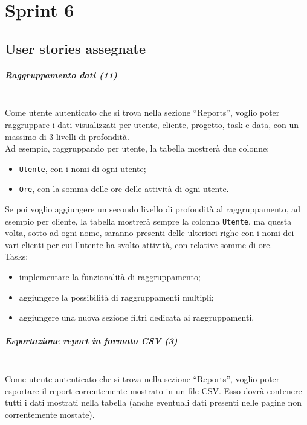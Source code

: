 
\chapter{Sprint 6}
\label{cap:sprint6}

\section{User stories assegnate}
\paragraph{Raggruppamento dati (11)}\mbox{} \\[\baselineskip]
Come utente autenticato che si trova nella sezione “Reports”, voglio poter raggruppare i dati visualizzati per utente, cliente, progetto, task e data, con un massimo di 3 livelli di profondità.\\
Ad esempio, raggruppando per utente, la tabella mostrerà due colonne:
\begin{itemize}
  \item \texttt{Utente}, con i nomi di ogni utente;
  \item \texttt{Ore}, con la somma delle ore delle attività di ogni utente.
\end{itemize}
Se poi voglio aggiungere un secondo livello di profondità al raggruppamento, ad esempio per cliente, la tabella mostrerà sempre la colonna \texttt{Utente}, ma questa volta, sotto ad ogni nome, saranno presenti delle ulteriori righe con i nomi dei vari clienti per cui l'utente ha svolto attività, con relative somme di ore.\\

\noindent Tasks:
\begin{itemize}
  \item implementare la funzionalità di raggruppamento;
  \item aggiungere la possibilità di raggruppamenti multipli;
  \item aggiungere una nuova sezione filtri dedicata ai raggruppamenti.
\end{itemize}

\paragraph{Esportazione report in formato CSV (3)}\mbox{} \\[\baselineskip]
Come utente autenticato che si trova nella sezione “Reports”, voglio poter esportare il report correntemente mostrato in un file CSV. 
Esso dovrà contenere tutti i dati mostrati nella tabella (anche eventuali dati presenti nelle pagine non correntemente mostate).\\

